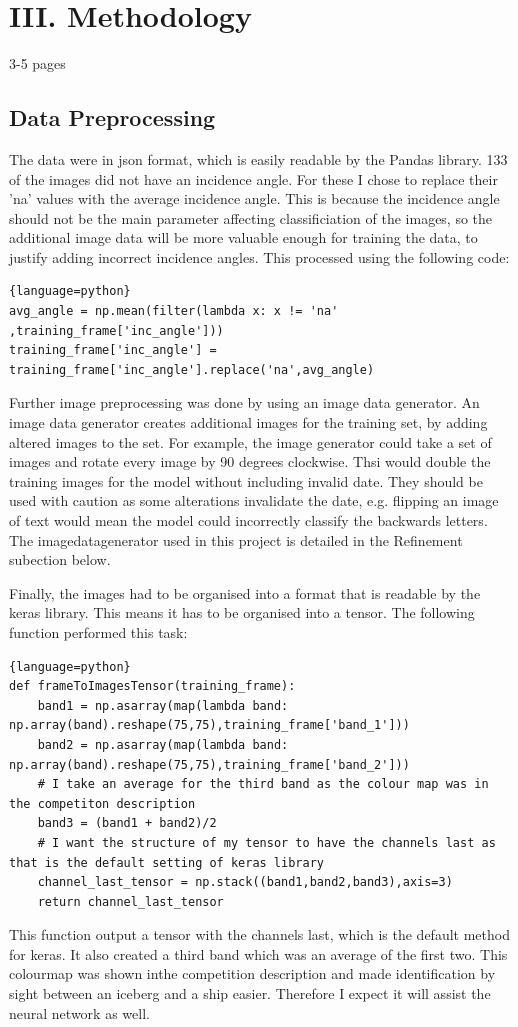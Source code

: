 \documentclass{article}
\begin{document}
\section{III. Methodology}
3-5 pages
\subsection{Data Preprocessing}
The data were in json format, which is easily readable by the Pandas library. 133 of the images did not have an incidence angle. For these I chose to replace their 'na' values with the average incidence angle. This is because the incidence angle should not be the main parameter affecting classificiation of the images, so the additional image data will be more valuable enough for training the data, to justify adding incorrect incidence angles. This processed using the following code:
\begin{lstlisting}{language=python}
avg_angle = np.mean(filter(lambda x: x != 'na' ,training_frame['inc_angle']))
training_frame['inc_angle'] = training_frame['inc_angle'].replace('na',avg_angle)
\end{lstlisting}

Further image preprocessing was done by using an image data generator. An image data generator creates additional images for the training set, by adding altered images to the set. For example, the image generator could take a set of images and rotate every image by 90 degrees clockwise. Thsi would double the training images for the model without including invalid date. They should be used with caution as some alterations invalidate the date, e.g. flipping an image of text would mean the model could incorrectly classify the backwards letters. The imagedatagenerator used in this project is detailed in the Refinement subection below.

Finally, the images had to be organised into a format that is readable by the keras library. This means it has to be organised into a tensor. The following function performed this task:
\begin{lstlisting}{language=python}
def frameToImagesTensor(training_frame):
    band1 = np.asarray(map(lambda band: np.array(band).reshape(75,75),training_frame['band_1']))
    band2 = np.asarray(map(lambda band: np.array(band).reshape(75,75),training_frame['band_2']))
    # I take an average for the third band as the colour map was in the competiton description
    band3 = (band1 + band2)/2
    # I want the structure of my tensor to have the channels last as that is the default setting of keras library
    channel_last_tensor = np.stack((band1,band2,band3),axis=3)
    return channel_last_tensor
\end{lstlisting}
This function output a tensor with the channels last, which is the default method for keras. It also created a third band which was an average of the first two. This colourmap was shown inthe competition description and made identification by sight between an iceberg and a ship easier. Therefore I expect it will assist the neural network as well. 
	
\end{document}

